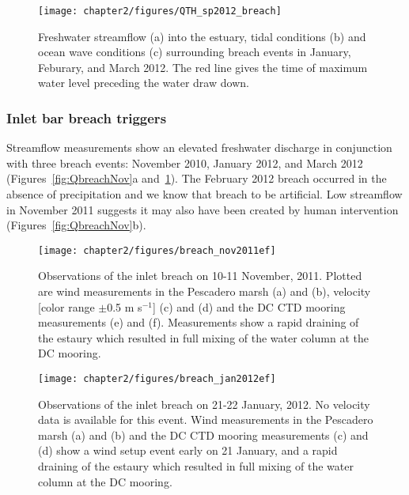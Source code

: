 \begin{figure}
\texttt{[image: chapter2/figures/QTH\_sp2012\_breach]}
\caption{Freshwater streamflow (a) into the estuary, tidal conditions (b) and ocean wave conditions (c) surrounding breach events in January, Feburary, and March 2012. The red line gives the time of maximum water level preceding the water draw down.} \label{fig:QbreachSpring2012}
\end{figure}


\subsubsection{Inlet bar breach triggers}
Streamflow measurements show an elevated freshwater discharge in conjunction with three breach events: November 2010, January 2012, and March 2012 (Figures~\ref{fig:QbreachNov}a and~\ref{fig:QbreachSpring2012}). The February 2012 breach occurred in the absence of precipitation and we know that breach to be artificial. Low streamflow in November 2011 suggests it may also have been created by human intervention (Figures~\ref{fig:QbreachNov}b). 


\begin{figure}[tbh]
	\texttt{[image: chapter2/figures/breach\_nov2011ef]} \caption{Observations of the inlet breach on 10-11 November, 2011. Plotted are wind measurements in the Pescadero marsh (a) and (b), velocity [color range $\pm$0.5 m s$^{-1}$] (c) and (d) and the DC CTD mooring measurements (e) and (f). Measurements show a rapid draining of the estaury which resulted in full mixing of the water column at the DC mooring.} \label{fig:breach_nov2011}
\end{figure}

\begin{figure}[tbh]
	\centering
	\texttt{[image: chapter2/figures/breach\_jan2012ef]} 
	\caption{Observations of the inlet breach on 21-22 January, 2012. No velocity data is available for this event. Wind measurements in the Pescadero marsh (a) and (b) and the DC CTD mooring measurements (c) and (d) show a wind setup event early on 21 January, and a rapid draining of the estaury which resulted in full mixing of the water column at the DC mooring.} \label{fig:breach_jan2012}
\end{figure}

